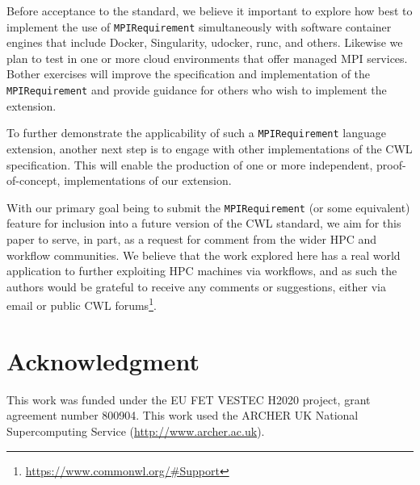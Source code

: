 \documentclass[conference]{IEEEtran}
\newcommand{\cwl}[1]{\texttt{#1}}
\begin{document}
Before acceptance to the standard, we believe it important to explore how best to implement the use of \cwl{MPIRequirement} simultaneously with software container engines that include Docker, Singularity, udocker, runc, and others. Likewise we plan to test in one or more cloud environments that offer managed MPI services. Bother exercises will improve the specification and implementation of the \cwl{MPIRequirement} and provide guidance for others who wish to implement the extension.

To further demonstrate the applicability of such a \cwl{MPIRequirement} language extension, another next step is to engage with other implementations of the CWL specification. This will enable the production of one or more independent, proof-of-concept, implementations of our extension.

With our primary goal being to submit the \cwl{MPIRequirement} (or some equivalent) feature for inclusion into a future version of the CWL standard, we aim for this paper to serve, in part, as a request for comment from the wider HPC and workflow communities. We believe that the work explored here has a real world application to further exploiting HPC machines via workflows, and as such the authors would be grateful to receive any comments or suggestions, either via email or public CWL forums\footnote{\url{https://www.commonwl.org/#Support}}.

\section*{Acknowledgment}
This work was funded under the EU FET VESTEC H2020 project, grant agreement number 800904.
This work used the ARCHER UK National Supercomputing Service (\url{http://www.archer.ac.uk}).








%


\end{document}

